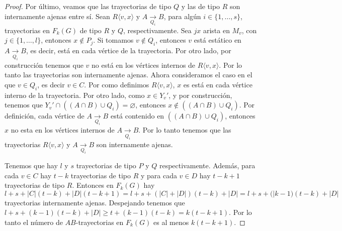 \begin{proof}
    Por \'ultimo, veamos que las trayectorias de tipo $Q$ y las de tipo $R$ son
    internamente ajenas entre s\'i{}. Sean $R\langle v,x \rangle$ y $A
    \xrightarrow[Q_i]{}  B$, para alg\'un $i \in \{1, \dots, s\}$, trayectorias
    en $F_k(G)$ de tipo $R$ y $Q$, respectivamente. Sea $jx$ arista en $M_v$,
    con $j \in \{1, \dots, l\}$, entonces $x \notin P_j$. Si tomamos $v \notin
    Q_i$, entonces $v$ est\'a est\'atico en $A \xrightarrow[Q_i]{} B$, es decir,
    est\'a en cada v\'ertice de la trayectoria. Por otro lado, por
    construcci\'on tenemos que $v$ no est\'a en los v\'ertices internos de $R
    \langle v, x \rangle$. Por lo tanto las trayectorias son internamente
    ajenas. Ahora consideramos el caso en el que $v \in Q_i$, es decir $v \in
    C$. Por como definimos $R \langle v,x \rangle$, $x$ es est\'a en cada
    v\'ertice interno de la trayectoria. Por otro lado, como $x \in Y_v'$, y por
    construcci\'on, tenemos que $Y_v ' \cap ((A\cap B) \cup Q_i) = \varnothing$,
    entonces $x \notin ((A \cap B) \cup Q_i)$. Por definici\'on, cada v\'ertice
    de $A \xrightarrow[Q_i]{}  B$ est\'a contenido en $((A \cap B) \cup Q_i)$,
    entonces $x$ no esta en los v\'ertices internos de $A \xrightarrow[Q_i]{}
    B$. Por lo tanto tenemos que las trayectorias $R \langle v,x \rangle$ y $A
    \xrightarrow[Q_i]{}  B$ son internamente ajenas.

    Tenemos que hay $l$ y $s$ trayectorias de tipo $P$ y $Q$ respectivamente.
    Adem\'as, para cada $v \in C$ hay $t-k$ trayectorias de tipo $R$ y para cada
    $v \in D$ hay $t-k+1$ trayectorias de tipo $R$. Entonces en $F_k(G)$ hay $l+
    s+ |C|(t-k)+ |D|(t-k +1) = l + s + (|C| + |D|)(t-k) + |D| = l + s +
    (|k-1)(t-k) + |D|$ trayectorias internamente ajenas. Despejando tenemos que
    $l + s + (k-1)(t-k) + |D| \geq t+ (k-1)(t-k) = k (t -k +1)$. Por lo tanto el
    n\'umero de $AB$-trayectorias en $F_k(G)$ es al menos $k(t-k+1)$.
\end {proof}



    


